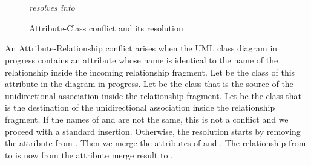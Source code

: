 \documentclass[sigconf]{acmart}
\begin{document}
\begin{figure}[h]
    \centering
    \quad  \quad
    \\ \quad \\
    \textit{resolves into}\\
    \caption{Attribute-Class conflict and its resolution}
    \label{fig:attribute-class-conflict}
\end{figure}

An Attribute-Relationship conflict arises when the UML class diagram in progress contains an attribute  whose name is identical to the name of the relationship inside the incoming relationship fragment. Let  be the class of this attribute  in the diagram in progress. Let  be the class that is the source of the unidirectional association inside the relationship fragment. Let  be the class that is the destination of the unidirectional association inside the relationship fragment. If the names of  and  are not the same, this is not a conflict and we proceed with a standard insertion. Otherwise, the resolution starts by removing the attribute  from . Then we merge the attributes of  and . The relationship from  to  is now from the attribute merge result  to . 
\end{document}
